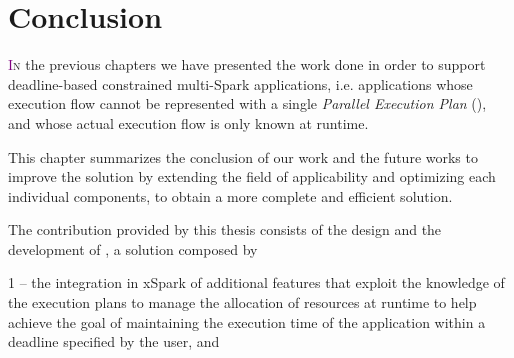 \chapter{Conclusion} \label{chap:conclusion}
\lettrine[lines=4]{\textcolor{purple}{I}}{n} the previous chapters we have presented the work done in order to support deadline-based \qos constrained multi-\plan Spark applications, i.e. applications whose execution flow cannot be represented with a single \textit{Parallel Execution Plan} (\plan), and whose actual execution flow is only known at runtime. 

This chapter summarizes the conclusion of our work and the future works to improve the solution by extending the field of applicability and optimizing each  individual components, to obtain a more complete and efficient solution.



The contribution provided by this thesis consists of the design and the development of \tool, a solution composed by 


1 -- the integration in xSpark of additional features that exploit the knowledge of the execution plans to manage the allocation of resources at runtime to help achieve the goal of maintaining the execution time of the application within a deadline specified by the user, and 

